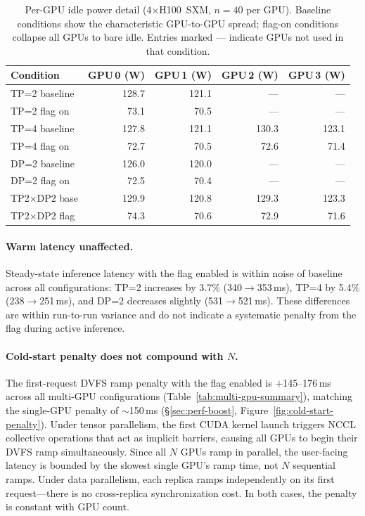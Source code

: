 \documentclass[sigconf,nonacm]{acmart}
\begin{document}
\begin{table}[t]
\caption{Per-GPU idle power detail (4$\times$H100~SXM, $n=40$ per GPU). Baseline conditions show the characteristic GPU-to-GPU spread; flag-on conditions collapse all GPUs to bare idle. Entries marked --- indicate GPUs not used in that condition.}
\label{tab:multi-gpu-per-gpu}
\small
\begin{tabular}{@{}lrrrr@{}}
\toprule
\textbf{Condition} & \textbf{GPU\,0 (W)} & \textbf{GPU\,1 (W)} & \textbf{GPU\,2 (W)} & \textbf{GPU\,3 (W)} \\
\midrule
TP=2 baseline & 128.7 & 121.1 & --- & --- \\
TP=2 flag on & 73.1 & 70.5 & --- & --- \\
TP=4 baseline & 127.8 & 121.1 & 130.3 & 123.1 \\
TP=4 flag on & 72.7 & 70.5 & 72.6 & 71.4 \\
DP=2 baseline & 126.0 & 120.0 & --- & --- \\
DP=2 flag on & 72.5 & 70.4 & --- & --- \\
TP2$\times$DP2 base & 129.9 & 120.8 & 129.3 & 123.3 \\
TP2$\times$DP2 flag & 74.3 & 70.6 & 72.9 & 71.6 \\
\bottomrule
\end{tabular}
\end{table}

\paragraph{Warm latency unaffected.} Steady-state inference latency with the flag enabled is within noise of baseline across all configurations: TP=2 increases by 3.7\% (340$\to$353\,ms), TP=4 by 5.4\% (238$\to$251\,ms), and DP=2 decreases slightly (531$\to$521\,ms). These differences are within run-to-run variance and do not indicate a systematic penalty from the flag during active inference.

\paragraph{Cold-start penalty does not compound with $N$.} The first-request DVFS ramp penalty with the flag enabled is $+$145--176\,ms across all multi-GPU configurations (Table~\ref{tab:multi-gpu-summary}), matching the single-GPU penalty of ${\sim}$150\,ms (\S\ref{sec:perf-boost}, Figure~\ref{fig:cold-start-penalty}). Under tensor parallelism, the first CUDA kernel launch triggers NCCL collective operations that act as implicit barriers, causing all GPUs to begin their DVFS ramp simultaneously. Since all $N$ GPUs ramp in parallel, the user-facing latency is bounded by the slowest single GPU's ramp time, not $N$ sequential ramps. Under data parallelism, each replica ramps independently on its first request---there is no cross-replica synchronization cost. In both cases, the penalty is constant with GPU count.
\end{document}
